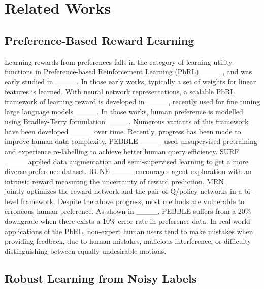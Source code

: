 \section{Related Works}
\subsection{Preference-Based Reward Learning}
\vspace{-5pt}
Learning rewards from preferences falls in the category of learning utility functions in Preference-based Reinforcement Learning (PbRL) ____, and was early studied in  ____. In those early works, typically a set of weights for linear features is learned. With neural network representations, a scalable PbRL framework of learning reward is developed in ____, recently used for fine tuning large language models ____.  In those works, human preference is modelled using  Bradley-Terry formulation ____.
Numerous variants of this framework have been developed ____ over time. Recently, progress has been made to improve human data complexity. PEBBLE ____ used unsupervised pretraining and experience re-labelling to achieve better human query efficiency. SURF ____ applied data augmentation and semi-supervised learning to get a more diverse preference dataset. RUNE ____ encourages agent exploration with an intrinsic reward measuring the uncertainty of reward prediction. MRN ____ jointly optimizes the reward network and the pair of Q/policy networks in a bi-level framework. Despite the above progress, most methods are vulnerable to erroneous human preference. As shown in ____, PEBBLE suffers from a 20\% downgrade when there exists a 10\% error rate in preference data. In real-world applications of the PbRL, non-expert human users tend to make mistakes when providing feedback, due to human mistakes,  malicious interference, or difficulty distinguishing between equally undesirable motions. 








\vspace{-5pt}
\subsection{Robust Learning from Noisy Labels}
\vspace{-5pt}

